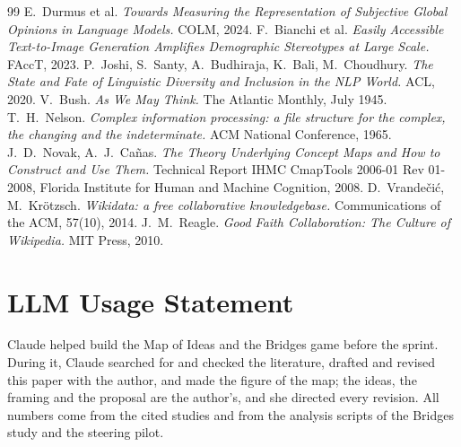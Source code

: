 \documentclass[11pt]{article}
\begin{document}
\begin{thebibliography}{99}
 E.\ Durmus et al. \emph{Towards Measuring the Representation of Subjective Global Opinions in Language Models.} COLM, 2024.
 F.\ Bianchi et al. \emph{Easily Accessible Text-to-Image Generation Amplifies Demographic Stereotypes at Large Scale.} FAccT, 2023.
 P.\ Joshi, S.\ Santy, A.\ Budhiraja, K.\ Bali, M.\ Choudhury. \emph{The State and Fate of Linguistic Diversity and Inclusion in the NLP World.} ACL, 2020.
 V.\ Bush. \emph{As We May Think.} The Atlantic Monthly, July 1945.
 T.\ H.\ Nelson. \emph{Complex information processing: a file structure for the complex, the changing and the indeterminate.} ACM National Conference, 1965.
 J.\ D.\ Novak, A.\ J.\ Cañas. \emph{The Theory Underlying Concept Maps and How to Construct and Use Them.} Technical Report IHMC CmapTools 2006-01 Rev 01-2008, Florida Institute for Human and Machine Cognition, 2008.
 D.\ Vrandečić, M.\ Krötzsch. \emph{Wikidata: a free collaborative knowledgebase.} Communications of the ACM, 57(10), 2014.
 J.\ M.\ Reagle. \emph{Good Faith Collaboration: The Culture of Wikipedia.} MIT Press, 2010.
\end{thebibliography}

\section*{LLM Usage Statement}
Claude helped build the Map of Ideas and the Bridges game before the sprint. During it, Claude searched for and checked the literature, drafted and revised this paper with the author, and made the figure of the map; the ideas, the framing and the proposal are the author's, and she directed every revision. All numbers come from the cited studies and from the analysis scripts of the Bridges study and the steering pilot.
\end{document}
